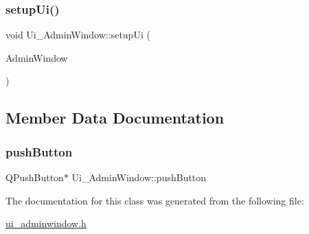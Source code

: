 \subsubsection{\texorpdfstring{setup\+Ui()}{setupUi()}}
{\footnotesize\ttfamily void Ui\+\_\+\+Admin\+Window\+::setup\+Ui (\begin{DoxyParamCaption}\item[{Q\+Dialog $\ast$}]{Admin\+Window }\end{DoxyParamCaption})\hspace{0.3cm}{\ttfamily [inline]}}



\subsection{Member Data Documentation}
\mbox{\label{class_ui___admin_window_aa4507cd98cd8c7e67cdfc68d4d558a67}} 
\subsubsection{\texorpdfstring{push\+Button}{pushButton}}
{\footnotesize\ttfamily Q\+Push\+Button$\ast$ Ui\+\_\+\+Admin\+Window\+::push\+Button}



The documentation for this class was generated from the following file\+:\begin{DoxyCompactItemize}
\item 
\hyperlink{ui__adminwindow_8h}{ui\+\_\+adminwindow.\+h}\end{DoxyCompactItemize}
